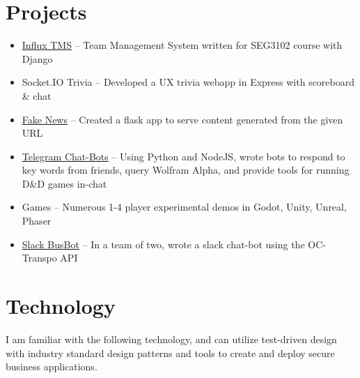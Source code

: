 \documentclass[]{rcf_cv}
\begin{document}
	


	
	\section{Projects}
		\begin{itemize}
			\setlength\itemsep{-0.4em}
			\renewcommand\labelitemi{--}
			
			\item \href{https://github.com/RyanFleck/Influx}{Influx TMS} -- Team Management System written for SEG3102 course with Django
			
			\item Socket.IO Trivia -- Developed a UX trivia webapp in Express with scoreboard \& chat
			
			\item \href{https://github.com/RyanFleck/Fake-News}{Fake News} -- Created a flask app to serve content generated from the given URL
			
			\item \href{https://github.com/RyanFleck/Telegram-Dungeon}{Telegram Chat-Bots} -- Using Python and NodeJS, wrote bots to respond to key words from friends, query Wolfram Alpha, and provide tools for running D\&D games in-chat
			
			\item Games -- Numerous 1-4 player experimental demos in Godot, Unity, Unreal, Phaser
			
			\item \href{https://github.com/morch028/BusBot}{Slack BusBot} -- In a team of two, wrote a slack chat-bot using the OC-Transpo API
			

			
		\end{itemize}

	\newpage

	\section{Technology}
	
		I am familiar with the following technology, and can utilize test-driven design with industry standard design patterns and tools to create and deploy secure business applications.
		
\end{document}
